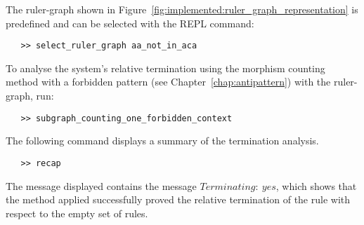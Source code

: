 The ruler-graph shown in Figure~\ref{fig:implemented:ruler_graph_representation} is predefined and can be selected with the REPL command:
 \begin{verbatim}
   >> select_ruler_graph aa_not_in_aca
 \end{verbatim}
To analyse the system's relative termination using the morphism counting method with a forbidden pattern (see Chapter~\ref{chap:antipattern}) with the ruler-graph, run:
 \begin{verbatim}
   >> subgraph_counting_one_forbidden_context
\end{verbatim}
The following command displays a summary of the termination analysis.
 \begin{verbatim}
   >> recap
\end{verbatim} 
The message displayed contains the message \colorbox{Ivory2}{$Terminating:\ yes$}, which shows that the method applied successfully proved the relative termination of the rule with respect to the empty set of rules.

